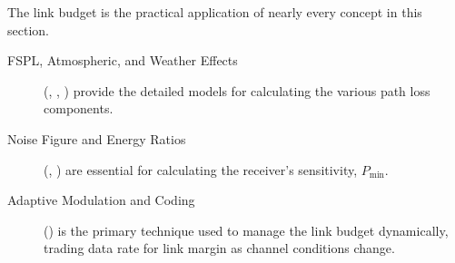 \begin{importantbox}[title={Further Reading}]
    The link budget is the practical application of nearly every concept in this section.
    \begin{description}
        \item[FSPL, Atmospheric, and Weather Effects] (, , ) provide the detailed models for calculating the various path loss components.
        \item[Noise Figure and Energy Ratios] (, ) are essential for calculating the receiver's sensitivity, $P_{\text{min}}$.
        \item[Adaptive Modulation and Coding] () is the primary technique used to manage the link budget dynamically, trading data rate for link margin as channel conditions change.
    \end{description}
\end{importantbox}